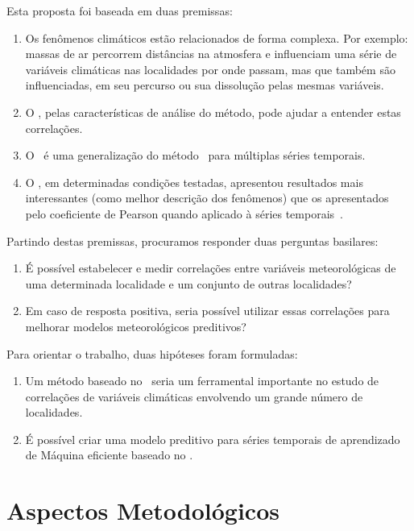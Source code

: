 Esta proposta foi baseada em duas premissas:

\begin{enumerate}
    \label{enum:premissas}
    \item Os fenômenos climáticos estão relacionados de forma complexa. Por exemplo: massas de ar percorrem distâncias na atmosfera e influenciam uma série de variáveis climáticas nas localidades por onde passam, mas que também são influenciadas, em seu percurso ou sua dissolução pelas mesmas variáveis.
    \item O \dmc, pelas características de análise do método, pode ajudar a entender estas correlações.
    \item O \dmc~é uma generalização do método \pdcca~para múltiplas séries temporais.
	\item O \pdcca, em determinadas condições testadas, apresentou resultados mais interessantes (como melhor descrição dos fenômenos) que os apresentados pelo coeficiente de Pearson quando aplicado à séries temporais~\cite{Wang2013}. 
\end{enumerate}

Partindo destas premissas, procuramos responder duas perguntas basilares:

\begin{enumerate}
    \label{enum:quest}

    \item É possível estabelecer e medir correlações entre variáveis meteorológicas de uma determinada localidade e um conjunto de outras localidades?

    \item Em caso de resposta positiva, seria possível utilizar essas correlações para melhorar modelos meteorológicos preditivos?
\end{enumerate}

Para orientar o trabalho, duas hipóteses foram formuladas:

\begin{enumerate}
    \item Um método baseado no \dmc~seria um ferramental importante no estudo de correlações de variáveis climáticas envolvendo um grande número de localidades.
	\item É possível criar uma modelo preditivo para séries temporais de aprendizado de Máquina eficiente baseado no \dmc.
\end{enumerate}

\section{Aspectos Metodológicos}
\label{sec:metodologia}

